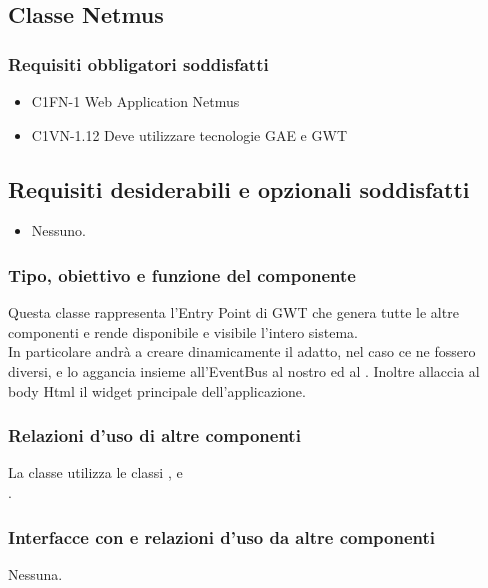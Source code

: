 \subsection{Classe Netmus}
\subsubsection*{Requisiti obbligatori soddisfatti}
\begin{itemize}
	\item C1FN-1 Web Application Netmus
	\item C1VN-1.12 Deve utilizzare tecnologie GAE e GWT
\end{itemize}
\subsection*{Requisiti desiderabili e opzionali soddisfatti}
\begin{itemize}
  \item Nessuno.
\end{itemize}
\subsubsection*{Tipo, obiettivo e funzione del componente}
Questa classe rappresenta l'Entry Point di GWT che genera tutte le altre
componenti e rende disponibile e visibile l'intero sistema.\\
In particolare andr\`a a creare dinamicamente il  adatto,
nel caso ce ne fossero diversi, e lo aggancia insieme all'EventBus al nostro
 ed al .
Inoltre allaccia al body Html il widget principale dell'applicazione.
\subsubsection*{Relazioni d'uso di altre componenti}
La classe  utilizza le classi ,
 e \\.
\subsubsection*{Interfacce con e relazioni d'uso da altre componenti}
Nessuna.
